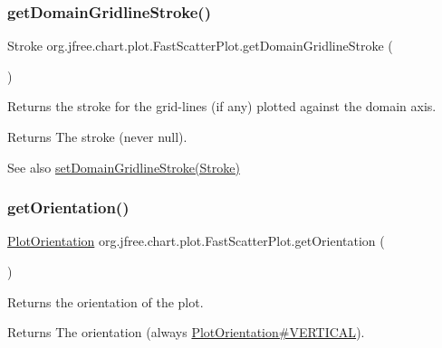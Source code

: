 \subsubsection{\texorpdfstring{get\+Domain\+Gridline\+Stroke()}{getDomainGridlineStroke()}}
{\footnotesize\ttfamily Stroke org.\+jfree.\+chart.\+plot.\+Fast\+Scatter\+Plot.\+get\+Domain\+Gridline\+Stroke (\begin{DoxyParamCaption}{ }\end{DoxyParamCaption})}

Returns the stroke for the grid-\/lines (if any) plotted against the domain axis.

\begin{DoxyReturn}{Returns}
The stroke (never {\ttfamily null}).
\end{DoxyReturn}
\begin{DoxySeeAlso}{See also}
\mbox{\hyperlink{classorg_1_1jfree_1_1chart_1_1plot_1_1_fast_scatter_plot_afdbb5ad6859e7e0319b781713845e104}{set\+Domain\+Gridline\+Stroke(\+Stroke)}} 
\end{DoxySeeAlso}
\mbox{\label{classorg_1_1jfree_1_1chart_1_1plot_1_1_fast_scatter_plot_af6a4373b3880bdd8c8e20d009c21c0fc}} 
\subsubsection{\texorpdfstring{get\+Orientation()}{getOrientation()}}
{\footnotesize\ttfamily \mbox{\hyperlink{classorg_1_1jfree_1_1chart_1_1plot_1_1_plot_orientation}{Plot\+Orientation}} org.\+jfree.\+chart.\+plot.\+Fast\+Scatter\+Plot.\+get\+Orientation (\begin{DoxyParamCaption}{ }\end{DoxyParamCaption})}

Returns the orientation of the plot.

\begin{DoxyReturn}{Returns}
The orientation (always \mbox{\hyperlink{classorg_1_1jfree_1_1chart_1_1plot_1_1_plot_orientation_a2b064227b679130eb0b5e3ac022e5371}{Plot\+Orientation\#\+V\+E\+R\+T\+I\+C\+AL}}). 
\end{DoxyReturn}


